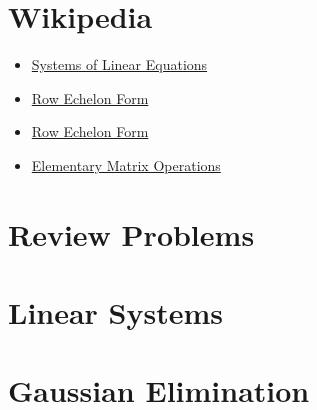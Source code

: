 \documentclass[12pt]{article}
\newcommand{\moduleinputProblems}[1]{}
\newcommand{\1}{{\rm 1\hspace*{-0.4ex}%
\rule{0.1ex}{1.52ex}\hspace*{0.2ex}}}
\begin{document}
\pagestyle{plain}






\tableofcontents









\newpage

\section*{Wikipedia}

\begin{itemize}
\item \href{http://en.wikipedia.org/wiki/System_of_linear_equations}{Systems of Linear Equations}

\item \href{http://en.wikipedia.org/wiki/Row_echelon_form}{Row Echelon Form}
 
\item \href{http://en.wikipedia.org/wiki/Row_echelon_form}{Row Echelon Form}

\item \href{http://en.wikipedia.org/wiki/Elementary_matrix_transformations}{Elementary Matrix Operations}
\end{itemize}


\newpage

\section*{Review Problems}

\section*{Linear Systems}

\moduleinputProblems{\whatIsPath/problems}

\newpage

\section*{Gaussian Elimination}
\end{document}
